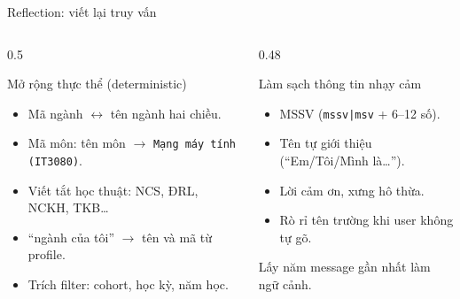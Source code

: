 \documentclass[t, aspectratio=169]{beamer}
\begin{document}
	\begin{frame}{Reflection: viết lại truy vấn}
		\begin{columns}[T,onlytextwidth]
			\begin{column}{0.5\textwidth}
				\begin{block}{Mở rộng thực thể (deterministic)}
					\begin{itemize}
						\item Mã ngành $\leftrightarrow$ tên ngành hai chiều.
						\item Mã môn: tên môn $\rightarrow$ \texttt{Mạng máy tính (IT3080)}.
						\item Viết tắt học thuật: NCS, ĐRL, NCKH, TKB\dots
						\item ``ngành của tôi'' $\rightarrow$ tên và mã từ profile.
						\item Trích filter: cohort, học kỳ, năm học.
					\end{itemize}
				\end{block}
			\end{column}
			\begin{column}{0.48\textwidth}
				\begin{block}{Làm sạch thông tin nhạy cảm}
					\begin{itemize}
						\item MSSV (\texttt{mssv|msv} + 6--12 số).
						\item Tên tự giới thiệu (``Em/Tôi/Mình là\dots'').
						\item Lời cảm ơn, xưng hô thừa.
						\item Rò rỉ tên trường khi user không tự gõ.
					\end{itemize}
				\end{block}
				\centering\scriptsize Lấy năm message gần nhất làm ngữ cảnh.
			\end{column}
		\end{columns}
	\end{frame}
\end{document}
